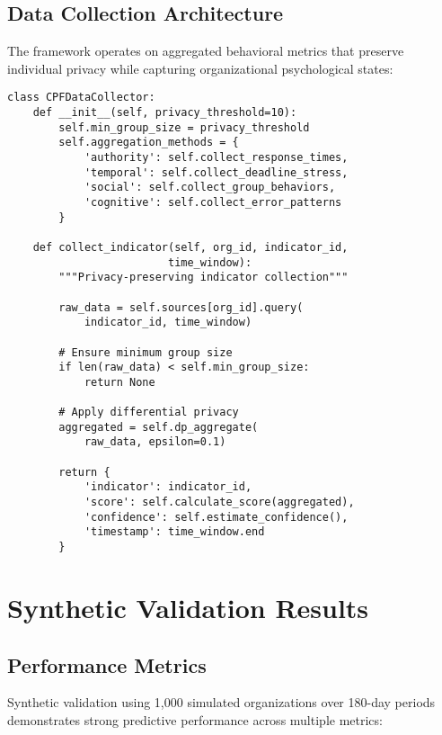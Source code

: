 \documentclass[10pt,twocolumn]{IEEEtran}
\begin{document}
\subsection{Data Collection Architecture}

The framework operates on aggregated behavioral metrics that preserve individual privacy while capturing organizational psychological states:

\begin{lstlisting}[caption={CPF Data Collection Interface},label={lst:collection}]
class CPFDataCollector:
    def __init__(self, privacy_threshold=10):
        self.min_group_size = privacy_threshold
        self.aggregation_methods = {
            'authority': self.collect_response_times,
            'temporal': self.collect_deadline_stress,
            'social': self.collect_group_behaviors,
            'cognitive': self.collect_error_patterns
        }
    
    def collect_indicator(self, org_id, indicator_id, 
                         time_window):
        """Privacy-preserving indicator collection"""
        
        raw_data = self.sources[org_id].query(
            indicator_id, time_window)
        
        # Ensure minimum group size
        if len(raw_data) < self.min_group_size:
            return None
            
        # Apply differential privacy
        aggregated = self.dp_aggregate(
            raw_data, epsilon=0.1)
        
        return {
            'indicator': indicator_id,
            'score': self.calculate_score(aggregated),
            'confidence': self.estimate_confidence(),
            'timestamp': time_window.end
        }
\end{lstlisting}

\section{Synthetic Validation Results}

\subsection{Performance Metrics}

Synthetic validation using 1,000 simulated organizations over 180-day periods demonstrates strong predictive performance across multiple metrics:
\end{document}
